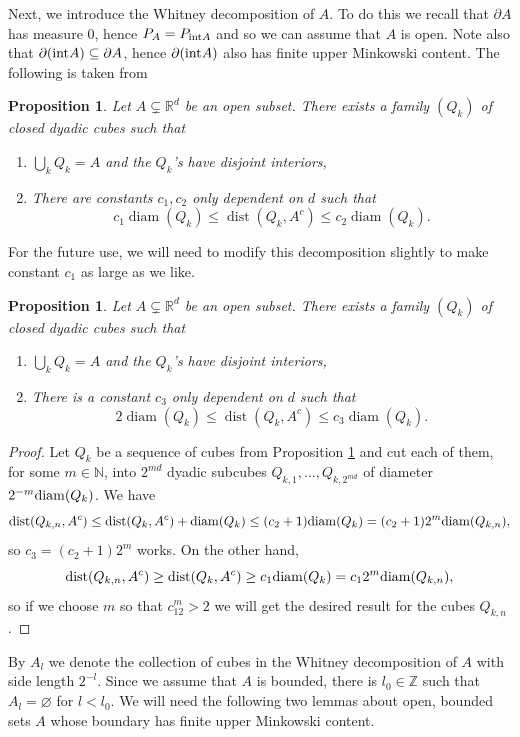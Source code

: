 \documentclass[12pt]{amsart}
\numberwithin{equation}{section}
\newcommand{\Z}{\mathbb{Z}}
\newcommand{\N}{\mathbb{N}}
\newcommand{\R}{\mathbb{R}}
\newtheorem{proposition}[Thm]{Proposition}
\begin{document}
Next, we introduce the Whitney decomposition of $A$. To do this we  recall that $\partial A$ has measure $0$, hence $P_A = P_{{\rm int} A}$ and so we can assume that $A$ is open. Note also that $\partial ({\rm int} A)\subseteq\partial A$, hence $\partial ({\rm int} A)$ also has finite upper Minkowski content. The following is taken from \cite[Appendix J]{Grafakos_classical}

\begin{proposition}\label{usual Whitney}
Let $A\subsetneq \R^d$ be an open subset. There exists a family $(Q_k)$ of closed dyadic cubes such that
\begin{enumerate}
    \item $\bigcup_k Q_k = A$ and the $Q_k$'s have disjoint interiors,
    \item There are constants $c_1, c_2$ only dependent on $d$ such that
    \[
    c_1 \operatorname{diam}(Q_k) \leq \operatorname{dist}(Q_k, A^c) \leq c_2 \operatorname{diam}(Q_k).
    \]
\end{enumerate}
\end{proposition}
For the future use, we will need to modify this decomposition slightly to make constant $c_1$ as large as we like.
\begin{proposition}\label{our Whitney}
Let $A\subsetneq \R^d$ be an open subset. There exists a family $(Q_k)$ of closed dyadic cubes such that
\begin{enumerate}
    \item $\bigcup_k Q_k = A$ and the $Q_k$'s have disjoint interiors,
    \item There is a constant $c_3$ only dependent on $d$ such that
    \[
    2 \operatorname{diam}(Q_k) \leq \operatorname{dist}(Q_k, A^c) \leq c_3 \operatorname{diam}(Q_k).
    \]
\end{enumerate}
\end{proposition}
\begin{proof}
Let $Q_k$ be a sequence of cubes from Proposition \ref{usual Whitney} and cut each of them, for some $m\in \N$, into $2^{md}$ dyadic subcubes $Q_{k,1},\ldots , Q_{k, 2^{md}}$ of diameter $2^{-m}{\rm diam}(Q_k)$. We have 
$${\rm dist}(Q_{k,n}, A^c) \le {\rm dist}(Q_{k}, A^c) +{\rm diam}(Q_{k}) \le (c_2 +1){\rm diam}(Q_{k}) = (c_2+1)2^m {\rm diam}(Q_{k,n}),$$
so $c_3 = (c_2+1)2^m$ works. On the other hand, 
$${\rm dist}(Q_{k,n}, A^c) \ge {\rm dist}(Q_k, A^c) \ge c_1 {\rm diam}(Q_k)= c_1 2^{m}{\rm diam}(Q_{k,n}),$$
so if we choose $m$ so that $c_12^m > 2$ we will get the desired result for the cubes $Q_{k,n}$.
\end{proof}
By $A_l$ we denote the collection of cubes in the Whitney decomposition of $A$ with side length $2^{-l}$. Since we assume that $A$ is bounded, there is $l_0 \in \Z$ such that $A_l = \varnothing$ for  $l < l_0$. We will need the following two lemmas about open, bounded sets $A$ whose boundary has finite upper Minkowski content.
\end{document}
